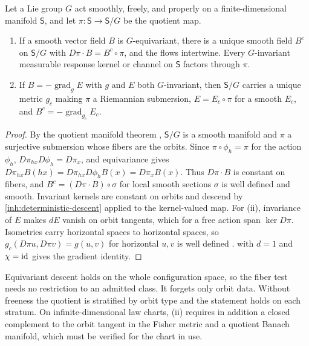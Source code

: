 Let a Lie group $G$ act smoothly, freely, and properly on a
finite-dimensional manifold $\mathsf S$, and let
$\pi:\mathsf S\to\mathsf S/G$ be the quotient map.
\begin{enumerate}
\item[(i)] If a smooth vector field $B$ is $G$-equivariant, there is a unique
smooth field $B^c$ on $\mathsf S/G$ with $D\pi\cdot B=B^c\circ\pi$, and the flows
intertwine. Every $G$-invariant measurable response kernel or channel on
$\mathsf S$ factors through $\pi$.
\item[(ii)] If $B=-\operatorname{grad}_gE$ with $g$ and $E$ both
$G$-invariant, then $\mathsf S/G$ carries a unique metric $g_c$ making $\pi$
a Riemannian submersion, $E=E_c\circ\pi$ for a smooth $E_c$, and
$B^c=-\operatorname{grad}_{g_c}E_c$.
\end{enumerate}
\begin{proof}
By the quotient manifold theorem \citep[Thm.~21.10]{Lee2013}, $\mathsf S/G$
is a smooth manifold and $\pi$ a surjective submersion whose fibers are the
orbits. Since $\pi\circ\phi_h=\pi$ for the action $\phi_h$,
$D\pi_{hx}D\phi_h=D\pi_x$, and equivariance gives
$D\pi_{hx}B(hx)=D\pi_{hx}D\phi_hB(x)=D\pi_xB(x)$. Thus $D\pi\cdot B$ is constant
on fibers, and $B^c=(D\pi\cdot B)\circ\sigma$ for local smooth sections $\sigma$ is
well defined and smooth. Invariant kernels are constant on orbits and
descend by \cref{inh:deterministic-descent} applied to the kernel-valued map.
For (ii), invariance of $E$ makes $dE$ vanish on orbit tangents, which for a
free action span $\ker D\pi$. Isometries carry horizontal spaces to
horizontal spaces, so $g_c(D\pi u,D\pi v)=g(u,v)$ for horizontal $u,v$ is well
defined \citep{ONeill1966}.  with $d=1$ and
$\chi=\mathrm{id}$ gives the gradient identity.
\end{proof}

Equivariant descent holds on the whole configuration space, so the fiber
test needs no restriction to an admitted class. It forgets only orbit data.
Without freeness the quotient is stratified by orbit type and the statement
holds on each stratum. On infinite-dimensional law charts, (ii) requires in
addition a closed complement to the orbit tangent in the Fisher metric and a
quotient Banach manifold, which must be verified for the chart in use.

